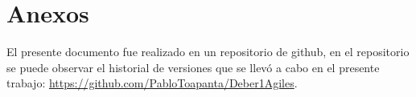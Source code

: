 \documentclass[pdflatex,sn-mathphys-num]{sn-jnl}%
\theoremstyle{thmstyleone}%
\theoremstyle{thmstyletwo}%
\theoremstyle{thmstylethree}%
\begin{document}






\section{Anexos}
El presente documento fue realizado en un repositorio de github, en el repositorio se puede observar el historial de versiones que se llevó a cabo en el presente trabajo: \url{https://github.com/PabloToapanta/Deber1Agiles}.
\end{document}
